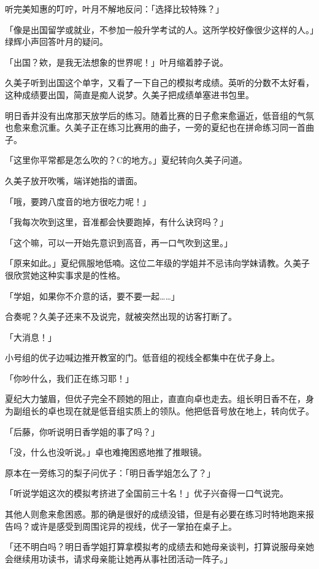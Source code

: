 \documentclass[UTF8]{ctexart}
\begin{document}
    听完美知惠的叮咛，叶月不解地反问：「选择比较特殊？」 

    「像是出国留学或就业，不参加一般升学考试的人。这所学校好像很少这样的人。」绿辉小声回答叶月的疑问。 

    「出国？欸，是我无法想象的世界呢！」叶月缩着脖子说。 

    久美子听到出国这个单字，又看了一下自己的模拟考成绩。英听的分数不太好看，这种成绩要出国，简直是痴人说梦。久美子把成绩单塞进书包里。 

    明日香并没有出席那天放学后的练习。随着比赛的日子愈来愈逼近，低音组的气氛也愈来愈沉重。久美子正在练习比赛用的曲子，一旁的夏纪也在拼命练习同一首曲子。 

    「这里你平常都是怎么吹的？C的地方。」夏纪转向久美子问道。 

    久美子放开吹嘴，端详她指的谱面。 

    「哦，要跨八度音的地方很吃力呢！」 

    「我每次吹到这里，音准都会快要跑掉，有什么诀窍吗？」 

    「这个嘛，可以一开始先意识到高音，再一口气吹到这里。」 

    「原来如此。」夏纪佩服地低喃。这位二年级的学姐并不忌讳向学妹请教。久美子很欣赏她这种实事求是的性格。 

    「学姐，如果你不介意的话，要不要一起……」 

    合奏呢？久美子还来不及说完，就被突然出现的访客打断了。 

    「大消息！」 

    小号组的优子边喊边推开教室的门。低音组的视线全都集中在优子身上。 

    「你吵什么，我们正在练习耶！」 

    夏纪大力皱眉，但优子完全不顾她的阻止，直直向卓也走去。组长明日香不在，身为副组长的卓也现在就是低音组实质上的领队。他把低音号放在地上，转向优子。 

    「后藤，你听说明日香学姐的事了吗？」 

    「没，什么也没听说。」卓也难掩困惑地推了推眼镜。 

    原本在一旁练习的梨子问优子：「明日香学姐怎么了？」 

    「听说学姐这次的模拟考挤进了全国前三十名！」优子兴奋得一口气说完。 

    其他人则愈来愈困惑。那的确是很好的成绩没错，但是有必要在练习时特地跑来报告吗？或许是感受到周围诧异的视线，优子一掌拍在桌子上。 

    「还不明白吗？明日香学姐打算拿模拟考的成绩去和她母亲谈判，打算说服母亲她会继续用功读书，请求母亲能让她再从事社团活动一阵子。」 
\end{document}
